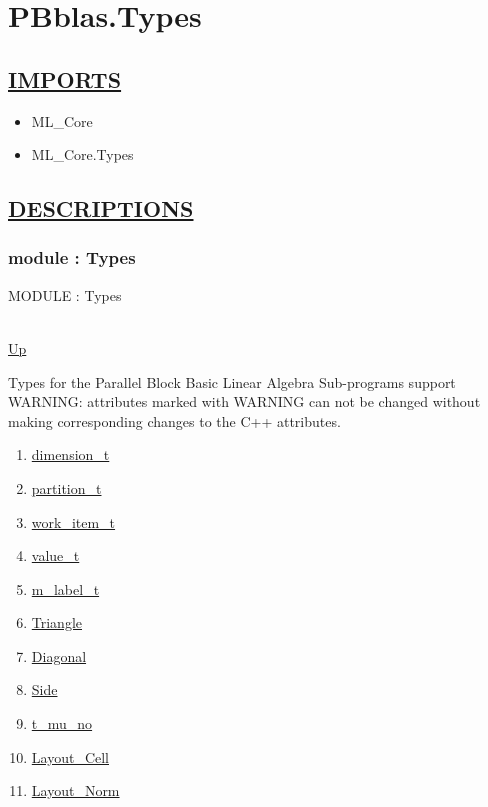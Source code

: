 \chapter*{PBblas.Types}
\hypertarget{PBblas.Types}{}

\section*{\underline{IMPORTS}}
\begin{itemize}
\item ML\_Core
\item ML\_Core.Types
\end{itemize}

\section*{\underline{DESCRIPTIONS}}
\subsection*{module : Types}
\hypertarget{ecldoc:PBblas.Types}{MODULE : Types} \\
\hyperlink{ecldoc:}{Up} \\
\par
Types for the Parallel Block Basic Linear Algebra Sub-programs support WARNING: attributes marked with WARNING can not be changed without making corresponding changes to the C++ attributes. \\
\begin{enumerate}
\item \hyperlink{ecldoc:pbblas.types.dimension_t}{dimension\_t}
\item \hyperlink{ecldoc:pbblas.types.partition_t}{partition\_t}
\item \hyperlink{ecldoc:pbblas.types.work_item_t}{work\_item\_t}
\item \hyperlink{ecldoc:pbblas.types.value_t}{value\_t}
\item \hyperlink{ecldoc:pbblas.types.m_label_t}{m\_label\_t}
\item \hyperlink{ecldoc:ecldoc-Triangle}{Triangle}
\item \hyperlink{ecldoc:ecldoc-Diagonal}{Diagonal}
\item \hyperlink{ecldoc:ecldoc-Side}{Side}
\item \hyperlink{ecldoc:pbblas.types.t_mu_no}{t\_mu\_no}
\item \hyperlink{ecldoc:pbblas.types.layout_cell}{Layout\_Cell}
\item \hyperlink{ecldoc:pbblas.types.layout_norm}{Layout\_Norm}
\end{enumerate}
